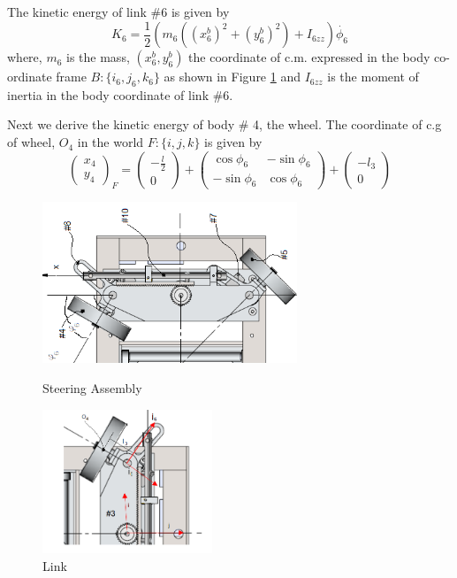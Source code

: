 { 


The kinetic energy of link  \#6 is given by
\begin{equation}
 K_6=\frac{1}{2}(m_6((x^b_6)^2+(y^b_6)^2)+I_{6zz})\dot{\phi_6}
\end{equation}
 where, $m_6$ is the mass, $(x^b_6,y^b_6)$  the coordinate of c.m.  expressed  in the body co-ordinate frame $B:\{i_6,j_6,k_6\}$ as shown in Figure \ref{fig:SteerLink} and $I_{6zz}$ is the moment of inertia in the body coordinate of link \#6.
 
 
 Next we derive the kinetic energy of body \# 4, the wheel. 
 The coordinate of c.g of wheel, $O_4$ in the world  $F:\{i,j,k\}$  is given by \[ \begin{pmatrix}
x_{4}\\y_{4} \end{pmatrix}_F
= \begin{pmatrix}-\frac{l}{2} \\0
\end{pmatrix}+
\begin{pmatrix}
		\cos\phi_6 &  -\sin\phi_6\\ -\sin\phi_6 & \cos\phi_6
\end{pmatrix} + 
\begin{pmatrix}
			-l_3\\0
\end{pmatrix}\]
\begin{figure}
	\begin{minipage}[t]{0.5\textwidth}
		\centering
		\includegraphics[width=3in]{Chapter4/fig/SteerModel} 
		\caption{Steering Assembly}\label{fig:SteerAsm}
	\end{minipage}
	\hfill
	\begin{minipage}[t]{0.5\textwidth}
		\centering
		\includegraphics[width=2in]{Chapter4/fig/link} 
		\caption{Link }\label{fig:SteerLink}
	\end{minipage}
\end{figure}
 	
}
